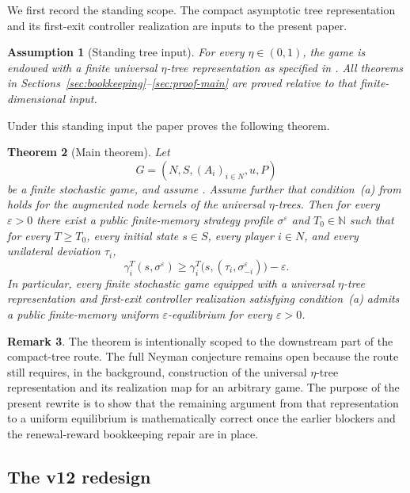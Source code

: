 \documentclass[12pt]{article}
\newtheorem{theorem}{Theorem}[section]
\newtheorem{assumption}[theorem]{Assumption}
\theoremstyle{definition}
\newtheorem{remark}[theorem]{Remark}
\newcommand{\eps}{\varepsilon}
\newcommand{\N}{\mathbb{N}}
\newcommand{\1}{\mathbf{1}}
\begin{document}
We first record the standing scope. The compact asymptotic tree representation and
its first-exit controller realization are inputs to the present paper.

\begin{assumption}[Standing tree input]
\label{ass:tree-input}
For every $\eta\in(0,1)$, the game is endowed with a finite universal
$\eta$-tree representation as specified in
. All theorems in
Sections~\ref{sec:bookkeeping}--\ref{sec:proof-main} are proved relative to that
finite-dimensional input.
\end{assumption}

Under this standing input the paper proves the following theorem.

\begin{theorem}[Main theorem]
\label{thm:main}
Let
\[
G=(N,S,(A_i)_{i\in N},u,P)
\]
be a finite stochastic game, and assume . Assume further
that condition~\textnormal{(a)} from  holds for the augmented node
kernels of the universal $\eta$-trees. Then for every $\eps>0$ there exist a
public finite-memory strategy profile $\sigma^\eps$ and $T_0\in\N$ such that for
every $T\ge T_0$, every initial state $s\in S$, every player $i\in N$, and every
unilateral deviation $\tau_i$,
\[
\gamma_i^T(s,\sigma^\eps)
\ge
\gamma_i^T\bigl(s,(\tau_i,\sigma^\eps_{-i})\bigr)-\eps.
\]
In particular, every finite stochastic game equipped with a universal
$\eta$-tree representation and first-exit controller realization satisfying
condition~\textnormal{(a)} admits a public finite-memory uniform
$\eps$-equilibrium for every $\eps>0$.
\end{theorem}

\begin{remark}
The theorem is intentionally scoped to the downstream part of the compact-tree
route. The full Neyman conjecture remains open because the route still requires,
in the background, construction of the universal $\eta$-tree representation and
its realization map for an arbitrary game. The purpose of the present rewrite is
to show that the remaining argument from that representation to a uniform
equilibrium is mathematically correct once the earlier blockers and the
renewal-reward bookkeeping repair are in place.
\end{remark}


\subsection{The v12 redesign}
\end{document}
